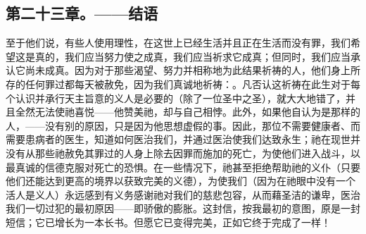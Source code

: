 
\subsection{第二十三章。——结语}

至于他们说，有些人使用理性，在这世上已经生活并且正在生活而没有罪，我们希望这是真的，我们应当努力使之成真，我们应当祈求它成真；但同时，我们应当承认它尚未成真。因为对于那些渴望、努力并相称地为此结果祈祷的人，他们身上所存的任何罪过都每天被赦免，因为我们真诚地祈祷：。凡否认这祈祷在此生对于每个认识并承行天主旨意的义人是必要的（除了一位圣中之圣），就大大地错了，并且全然无法使祂喜悦——他赞美祂，却与自己相悖。此外，如果他自认为是那样的人，——没有别的原因，只是因为他思想虚假的事。因此，那位不需要健康者、而需要患病者的医生，知道如何医治我们，并通过医治使我们达致永生；祂在现世并没有从那些祂赦免其罪过的人身上除去因罪而施加的死亡，为使他们进入战斗，以最真诚的信德克服对死亡的恐惧。在一些情况下，祂甚至拒绝帮助祂的义仆（只要他们还能达到更高的境界以获致完美的义德），为使我们（因为在祂眼中没有一个活人是义人）永远感到有义务感谢祂对我们的慈悲包容，从而藉圣洁的谦卑，医治我们一切过犯的最初原因——即骄傲的膨胀。这封信，按我最初的意图，原是一封短信；它已增长为一本长书。但愿它已变得完美，正如它终于完成了一样！\par

